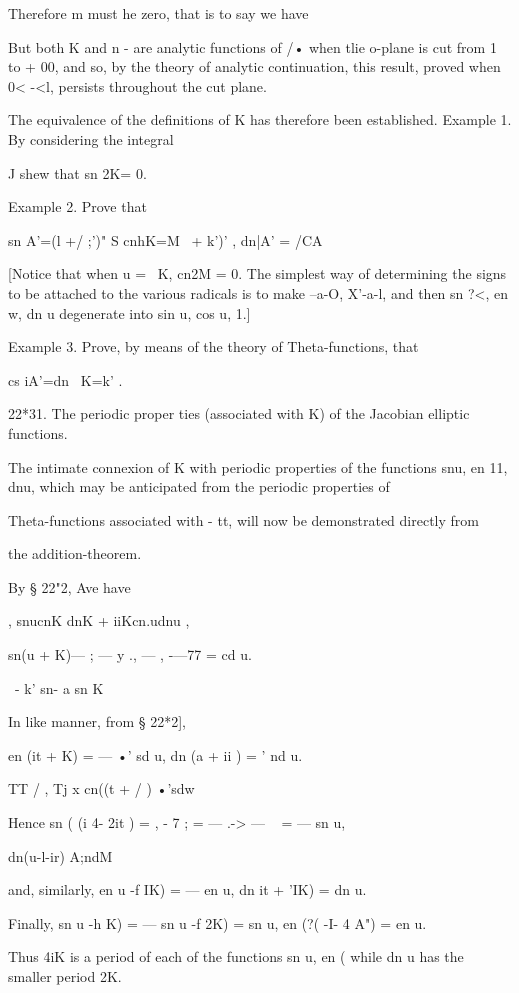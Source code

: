 Therefore m must he zero, that is to say we have

But both K and n - are analytic functions of /• when tlie o-plane is
cut from 1 to + 00, and so, by the theory of analytic continuation,
this result, proved when 0< -<l, persists throughout the cut plane.

The equivalence of the definitions of K has therefore been
established. Example 1. By considering the integral

J shew that sn 2K= 0.

Example 2. Prove that

sn A'=(l +/ ;')" S cnhK=M \ + k')' , dn|A' = /CA

[Notice that when u = \ K, cn2M = 0. The simplest way of determining
the signs to be attached to the various radicals is to make --a-O,
X'-a-l, and then sn ?<, en w, dn u degenerate into sin u, cos u, 1.]

Example 3. Prove, by means of the theory of Theta-functions, that

cs iA'=dn \ K=k' .

22*31. The periodic proper ties (associated with K) of the Jacobian
elliptic functions.

The intimate connexion of K with periodic properties of the functions
snu, en 11, dnu, which may be anticipated from the periodic properties
of

Theta-functions associated with - tt, will now be demonstrated
directly from

the addition-theorem.

By § 22"2, Ave have

 , snucnK dnK + iiKcn.udnu ,

sn(u + K)— ; — y ., — , -—77 = cd u.

  \ - k' sn- a sn K

In like manner, from § 22*2],

en (it + K) = — •' sd u, dn (a + ii ) = ' nd u.

TT / , Tj x cn((t + / ) •'sdw

Hence sn ( (i 4- 2it ) = , - 7 ; = — .-> — ~ = — sn u,

  dn(u-l-ir) A;ndM

and, similarly, en u -f IK) = — en u, dn it + 'IK) = dn u.

Finally, sn u -h K) = — sn u -f 2K) = sn u, en (?( -I- 4 A") = en u.

Thus 4iK is a period of each of the functions sn u, en ( while dn u
has the smaller period 2K.

